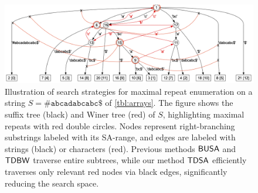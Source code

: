 

\begin{figure}[t]
\centering  
\includegraphics[width=1.00\textwidth]{fig/exp1/fwdstree_org.png}
\smallskip
\caption{
  Illustration of search strategies for maximal repeat enumeration on a string
  $S = \mathtt{\#abcadabcabc\$}$ of \cref{tbl:arrays}. 
  The figure shows the suffix tree (black) and Winer tree (red) of $S$, highlighting maximal repeats with red double circles. Nodes represent right-branching substrings labeled with its SA-range, and edges are labeled with strings (black) or characters (red). Previous methods $\textsf{BUSA}$ and $\textsf{TDBW}$ traverse entire subtrees, while our method $\textsf{TDSA}$ efficiently traverses only relevant red nodes via black edges, significantly reducing the search space.
}\label{fig:fwdstree}
\end{figure}



